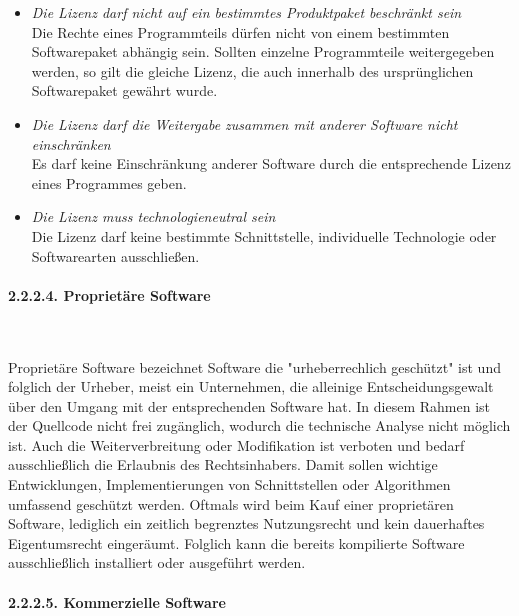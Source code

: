 \begin{itemize}
    \item \textit{Die Lizenz darf nicht auf ein bestimmtes Produktpaket beschränkt sein}\\
    Die Rechte eines Programmteils dürfen nicht von einem bestimmten Softwarepaket abhängig sein. Sollten einzelne Programmteile weitergegeben werden, so gilt die gleiche Lizenz, die auch innerhalb des ursprünglichen Softwarepaket gewährt wurde.

    \item \textit{Die Lizenz darf die Weitergabe zusammen mit anderer Software nicht einschränken}\\
    Es darf keine Einschränkung anderer Software durch die entsprechende Lizenz eines Programmes geben.

    \item \textit{Die Lizenz muss technologieneutral sein}\\
    Die Lizenz darf keine bestimmte Schnittstelle, individuelle Technologie oder Softwarearten ausschließen. 

\end{itemize}

\paragraph{2.2.2.4. Proprietäre Software}$~$

Proprietäre Software bezeichnet Software die "urheberrechlich geschützt" ist und folglich der Urheber, meist ein Unternehmen, die alleinige Entscheidungsgewalt über den Umgang mit der entsprechenden Software hat. \cite[S. 26]{groll_1x1_2021} In diesem Rahmen ist der Quellcode nicht frei zugänglich, wodurch die technische Analyse nicht möglich ist. \cite[S. 15]{wilmer_rechtliche_2021} Auch die Weiterverbreitung oder Modifikation ist verboten und bedarf ausschließlich die Erlaubnis des Rechtsinhabers. Damit sollen wichtige Entwicklungen, Implementierungen von Schnittstellen oder Algorithmen umfassend geschützt werden. Oftmals wird beim Kauf einer proprietären Software, lediglich ein zeitlich begrenztes Nutzungsrecht und kein dauerhaftes Eigentumsrecht eingeräumt. \cite[S. 15]{wilmer_rechtliche_2021} Folglich kann die bereits kompilierte Software ausschließlich installiert oder ausgeführt werden. 

\paragraph{2.2.2.5. Kommerzielle Software}$~$

